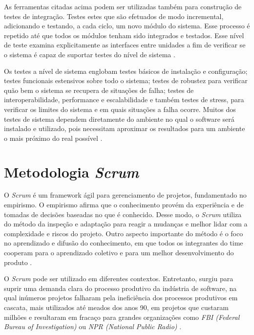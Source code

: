 As ferramentas citadas acima podem ser utilizadas também para construção de testes de integração. Testes estes que são efetuados de modo incremental, adicionando e testando, a cada ciclo, um novo módulo do sistema. Esse processo é repetido até que todos os módulos tenham sido integrados e testados. Esse nível de teste examina explicitamente as interfaces entre unidades a fim de verificar se o sistema é capaz de suportar testes do nível de sistema \cite{naik2008}.

Os testes a nível de sistema englobam testes básicos de instalação e configuração; testes funcionais estensivos sobre todo o sistema; testes de robustez para verificar quão bem o sistema se recupera de situações de falha; testes de interoperabilidade, performance e escalabilidade e também testes de stress, para verificar os limites do sistema e em quais situações a falha ocorre. Muitos dos testes de sistema dependem diretamente do ambiente no qual o software será instalado e utilizado, pois necessitam aproximar os resultados para um ambiente o mais próximo do real possível \cite{naik2008}.


\section{Metodologia \textit{Scrum}}

O \textit{Scrum} é um framework ágil para gerenciamento de projetos, fundamentado no empirismo. O empirismo afirma que o conhecimento provém da experiência e de tomadas de decisões baseadas no que é conhecido. Desse modo, o \textit{Scrum} utiliza do método da inspeção e adaptação para reagir a mudanças e melhor lidar com a complexidade e riscos do projeto. Outro aspecto importante do método é o foco no aprendizado e difusão do conhecimento, em que todos os integrantes do time cooperam para o aprendizado coletivo e para um melhor desenvolvimento do produto \cite{scrum2013}. 

O \textit{Scrum} pode ser utilizado em diferentes contextos. Entretanto, surgiu para suprir uma demanda clara do processo produtivo da indústria de software, na qual inúmeros projetos falharam pela ineficiência dos processos produtivos em cascata, mais utilizados até meados dos anos 90, em projetos que custaram milhões e resultaram em fracaço para grandes organizações como \textit{FBI (Federal Bureau of Investigation)} ou \textit{NPR (National Public Radio)} \cite{scrum2014}.

